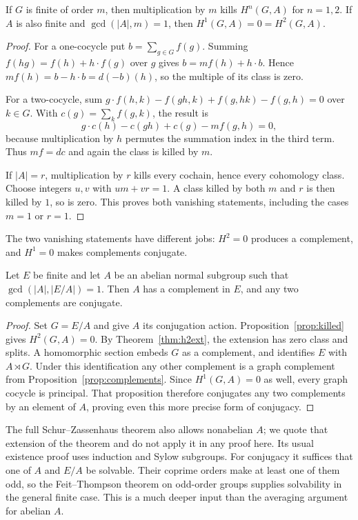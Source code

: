 \begin{proposition}\label{prop:killed}
If $G$ is finite of order $m$, then multiplication by $m$ kills $H^n(G,A)$ for $n=1,2$. If $A$ is also finite and $\gcd(|A|,m)=1$, then
$H^1(G,A)=0=H^2(G,A)$.
\end{proposition}

\begin{proof}
For a one-cocycle put $b=\sum_{g\in G}f(g)$. Summing
$f(hg)=f(h)+h\cdot f(g)$ over $g$ gives
$b=mf(h)+h\cdot b$. Hence
$mf(h)=b-h\cdot b=d(-b)(h)$, so the multiple of its class is zero.

For a two-cocycle, sum
$g\cdot f(h,k)-f(gh,k)+f(g,hk)-f(g,h)=0$ over $k\in G$.
With $c(g)=\sum_k f(g,k)$, the result is
\[
g\cdot c(h)-c(gh)+c(g)-mf(g,h)=0,
\]
because multiplication by $h$ permutes the summation index in the third term. Thus $mf=dc$ and again the class is killed by $m$.

If $|A|=r$, multiplication by $r$ kills every cochain, hence every cohomology class. Choose integers $u,v$ with $um+vr=1$. A class killed by both $m$ and $r$ is then killed by $1$, so is zero. This proves both vanishing statements, including the cases $m=1$ or $r=1$.
\end{proof}

The two vanishing statements have different jobs: $H^2=0$ produces a complement, and $H^1=0$ makes complements conjugate.

\begin{theorem}\label{thm:sz}
Let $E$ be finite and let $A$ be an abelian normal subgroup such that $\gcd(|A|,|E/A|)=1$. Then $A$ has a complement in $E$, and any two complements are conjugate.
\end{theorem}

\begin{proof}
Set $G=E/A$ and give $A$ its conjugation action. Proposition~\ref{prop:killed} gives $H^2(G,A)=0$. By Theorem~\ref{thm:h2ext}, the extension has zero class and splits. A homomorphic section embeds $G$ as a complement, and identifies $E$ with $A\rtimes G$.
Under this identification any other complement is a graph complement from Proposition~\ref{prop:complements}. Since $H^1(G,A)=0$ as well, every graph cocycle is principal. That proposition therefore conjugates any two complements by an element of $A$, proving even this more precise form of conjugacy.
\end{proof}

The full Schur--Zassenhaus theorem also allows nonabelian $A$; we quote that extension of the theorem and do not apply it in any proof here. Its usual existence proof uses induction and Sylow subgroups. For conjugacy it suffices that one of $A$ and $E/A$ be solvable. Their coprime orders make at least one of them odd, so the Feit--Thompson theorem on odd-order groups supplies solvability in the general finite case. This is a much deeper input than the averaging argument for abelian $A$.

